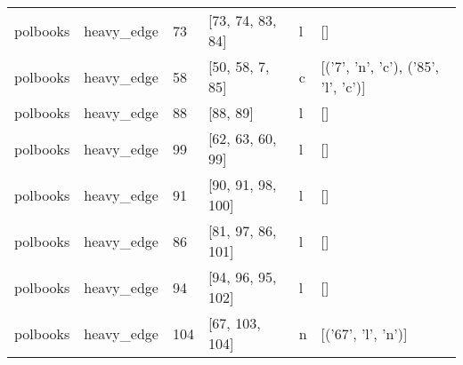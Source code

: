 \begin{tabular}{llllll}
polbooks & heavy_edge & 73 & [73, 74, 83, 84] & l & [] \\
polbooks & heavy_edge & 58 & [50, 58, 7, 85] & c & [('7', 'n', 'c'), ('85', 'l', 'c')] \\
polbooks & heavy_edge & 88 & [88, 89] & l & [] \\
polbooks & heavy_edge & 99 & [62, 63, 60, 99] & l & [] \\
polbooks & heavy_edge & 91 & [90, 91, 98, 100] & l & [] \\
polbooks & heavy_edge & 86 & [81, 97, 86, 101] & l & [] \\
polbooks & heavy_edge & 94 & [94, 96, 95, 102] & l & [] \\
polbooks & heavy_edge & 104 & [67, 103, 104] & n & [('67', 'l', 'n')] \\
\bottomrule
\end{tabular}



